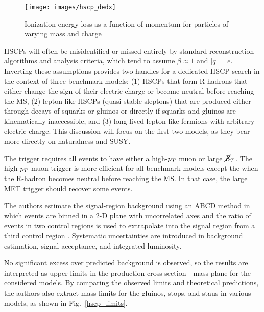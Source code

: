 \documentclass[12pt]{article}
\begin{document}
        \noindent \begin{figure}[htbp] \begin{center}
        \texttt{[image: images/hscp\_dedx]}
            \caption{Ionization energy loss as a function of momentum for particles of varying mass and charge~\cite{cms_hscp}}
        \label{hscp_dedx}
        \end{center} \end{figure}

        HSCPs will often be misidentified or missed entirely by standard reconstruction algorithms and analysis criteria, which tend to assume $\beta \approx \num{1}$ and $\lvert q \rvert = e$. Inverting these assumptions provides two handles for a dedicated HSCP search in the context of three benchmark models: (1) HSCPs that form R-hadrons that either change the sign of their electric charge or become neutral before reaching the MS, (2) lepton-like HSCPs (quasi-stable sleptons) that are produced either through decays of squarks or gluinos or directly if squarks and gluinos are kinematically inaccessible, and (3) long-lived lepton-like fermions with arbitrary electric charge. This discussion will focus on the first two models, as they bear more directly on naturalness and SUSY.

         

        The trigger requires all events to have either a high-$p_T$ muon or large $\cancel{\it{E}}_{T}$. The high-$p_T$ muon trigger is more efficient for all benchmark models except the when the R-hadron becomes neutral before reaching the MS. In that case, the large MET trigger should recover some events.

        The authors estimate the signal-region background using an ABCD method in which events are binned in a 2-D plane with uncorrelated axes and the ratio of events in two control regions is used to extrapolate into the signal region from a third control region . Systematic uncertainties are introduced in background estimation, signal acceptance, and integrated luminosity.

        No significant excess over predicted background is observed, so the results are interpreted as upper limits in the production cross section - mass plane for the considered models. By comparing the observed limits and theoretical predictions, the authors also extract mass limits for the gluinos, stops, and staus in various models, as shown in Fig.~\ref{hscp_limits}.
\end{document}
